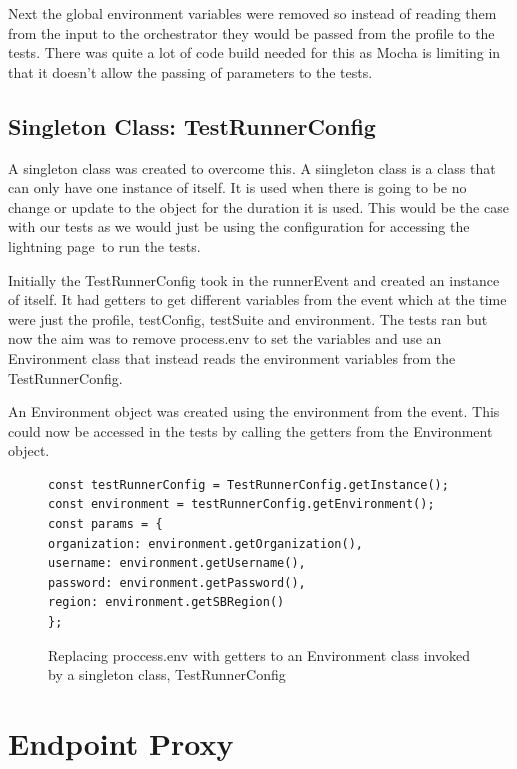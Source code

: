 \documentclass[12pt,a4paper,titlepage]{report}
\begin{document}
Next the global environment variables were removed so instead of reading them from the input to the orchestrator they would 
be passed from the profile to the tests. There was quite a lot of code build needed for this as Mocha is limiting in that it doesn't 
allow the passing of parameters to the tests. 

\subsection{Singleton Class: TestRunnerConfig}
A singleton class was created to overcome this. A siingleton class is a class that can only have one instance of 
itself. It is used when there is going to be no change or update to the object for the duration it is used. This would be the case with our tests as we would just be using the configuration for accessing the lightning page to run the tests.

Initially the TestRunnerConfig took in the runnerEvent and created an instance of itself. It had getters to get different variables from the event which at the time were just the profile, testConfig, testSuite and environment. The tests ran but now the aim was to remove process.env to set the variables and use an Environment class that instead reads the environment variables from the TestRunnerConfig.

An Environment object was created using the environment from the event. This could now be accessed in the tests by calling the getters from the Environment object.
\begin{figure}[H]
 \begin{tcolorbox}
  \begin{verbatim}
const testRunnerConfig = TestRunnerConfig.getInstance();
const environment = testRunnerConfig.getEnvironment();
const params = {
organization: environment.getOrganization(),
username: environment.getUsername(),
password: environment.getPassword(),
region: environment.getSBRegion()
};
\end{verbatim}
 \end{tcolorbox}
 \caption{Replacing proccess.env with getters to an Environment class invoked by a singleton class, TestRunnerConfig}
\end{figure}

\section{Endpoint Proxy}
\end{document}
